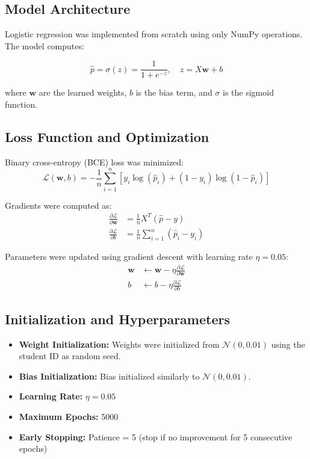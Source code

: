 \documentclass[11pt]{article}
\begin{document}
\subsection{Model Architecture}

Logistic regression was implemented from scratch using only NumPy operations. The model computes:

\begin{equation}
    \hat{p} = \sigma(z) = \frac{1}{1 + e^{-z}}, \quad z = X \mathbf{w} + b
\end{equation}

where $\mathbf{w}$ are the learned weights, $b$ is the bias term, and $\sigma$ is the sigmoid function.

\subsection{Loss Function and Optimization}

Binary cross-entropy (BCE) loss was minimized:
\begin{equation}
    \mathcal{L}(\mathbf{w}, b) = -\frac{1}{n} \sum_{i=1}^{n} \left[ y_i \log(\hat{p}_i) + (1-y_i) \log(1-\hat{p}_i) \right]
\end{equation}

Gradients were computed as:
\begin{align}
    \frac{\partial \mathcal{L}}{\partial \mathbf{w}} &= \frac{1}{n} X^T (\hat{p} - y) \\
    \frac{\partial \mathcal{L}}{\partial b} &= \frac{1}{n} \sum_{i=1}^{n} (\hat{p}_i - y_i)
\end{align}

Parameters were updated using gradient descent with learning rate $\eta = 0.05$:
\begin{align}
    \mathbf{w} &\leftarrow \mathbf{w} - \eta \frac{\partial \mathcal{L}}{\partial \mathbf{w}} \\
    b &\leftarrow b - \eta \frac{\partial \mathcal{L}}{\partial b}
\end{align}

\subsection{Initialization and Hyperparameters}

\begin{itemize}
    \item \textbf{Weight Initialization:} Weights were initialized from $\mathcal{N}(0, 0.01)$ using the student ID as random seed.
    \item \textbf{Bias Initialization:} Bias initialized similarly to $\mathcal{N}(0, 0.01)$.
    \item \textbf{Learning Rate:} $\eta = 0.05$
    \item \textbf{Maximum Epochs:} 5000
    \item \textbf{Early Stopping:} Patience = 5 (stop if no improvement for 5 consecutive epochs)
\end{itemize}
\end{document}
